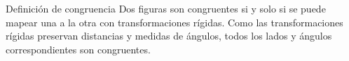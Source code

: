 \begin{infocard}{Definición de congruencia}
    Dos figuras son congruentes si y solo si se puede mapear una a la otra con transformaciones rígidas. Como las transformaciones rígidas preservan distancias y medidas de ángulos, todos los lados y ángulos correspondientes son congruentes.
\end{infocard}